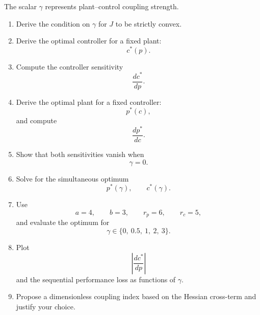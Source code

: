 The scalar $\gamma$ represents plant--control coupling strength.

\begin{enumerate}
    \item Derive the condition on $\gamma$ for $J$ to be strictly convex.

    \item Derive the optimal controller for a fixed plant:
    \begin{equation}
    c^*(p).
    \end{equation}

    \item Compute the controller sensitivity
    \begin{equation}
    \frac{dc^*}{dp}.
    \end{equation}

    \item Derive the optimal plant for a fixed controller:
    \begin{equation}
    p^*(c),
    \end{equation}
    and compute
    \begin{equation}
    \frac{dp^*}{dc}.
    \end{equation}

    \item Show that both sensitivities vanish when
    \begin{equation}
    \gamma=0.
    \end{equation}

    \item Solve for the simultaneous optimum
    \begin{equation}
    p^*(\gamma),
    \qquad
    c^*(\gamma).
    \end{equation}

    \item Use
    \begin{equation}
    a=4,
    \qquad
    b=3,
    \qquad
    r_p=6,
    \qquad
    r_c=5,
    \end{equation}
    and evaluate the optimum for
    \begin{equation}
    \gamma
    \in
    \{0,\ 0.5,\ 1,\ 2,\ 3\}.
    \end{equation}

    \item Plot
    \begin{equation}
    \left|
    \frac{dc^*}{dp}
    \right|
    \end{equation}
    and the sequential performance loss as functions of $\gamma$.

    \item Propose a dimensionless coupling index based on the Hessian
    cross-term and justify your choice.
\end{enumerate}


